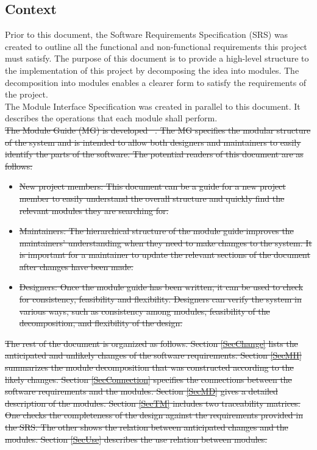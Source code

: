 \documentclass[12pt, titlepage]{article}
\begin{document}

\subsection{Context}
Prior to this document, the Software Requirements Specification (SRS) was created to outline all the functional and non-functional requirements this project must satisfy. The purpose of this document is to provide a high-level structure to the implementation of this project by decomposing the idea into modules. The decomposition into modules enables a clearer form to satisfy the requirements of the project.\\

\noindent The Module Interface Specification was created in parallel to this document. It describes the operations that each module shall perform.\\

\sout{\noindent The Module Guide (MG) is developed \mbox{~\citep{ParnasEtAl1984}}. The MG specifies the modular structure of the system and is intended to allow both designers and maintainers to easily identify the parts of the software. The potential readers of this document are as follows:}

\begin{itemize}
\item \sout{New project members: This document can be a guide for a new project member to easily understand the overall structure and quickly find the relevant modules they are searching for.}
\item \sout{Maintainers: The hierarchical structure of the module guide improves the maintainers' understanding when they need to make changes to the system. It is important for a maintainer to update the relevant sections of the document after changes have been made.}
\item \sout{Designers: Once the module guide has been written, it can be used to check for consistency, feasibility and flexibility. Designers can verify the system in various ways, such as consistency among modules, feasibility of the decomposition, and flexibility of the design.}
\end{itemize}

\sout{\noindent The rest of the document is organized as follows. Section \ref{SecChange} lists the anticipated and unlikely changes of the software requirements. Section \ref{SecMH} summarizes the module decomposition that was constructed according to the likely changes. Section \ref{SecConnection} specifies the connections between the software requirements and the modules. Section \ref{SecMD} gives a detailed description of the modules. Section \ref{SecTM} includes two traceability matrices. One checks the completeness of the design against the requirements provided in the SRS. The other shows the relation between anticipated changes and the modules. Section \ref{SecUse} describes the use relation between modules.}
\end{document}
